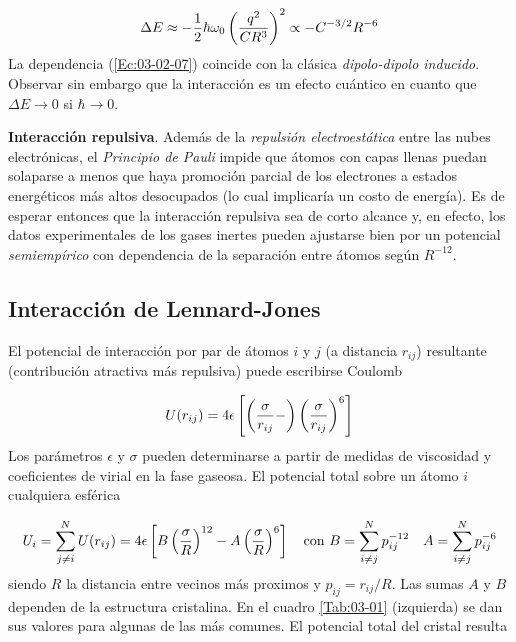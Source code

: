 \begin{equation}
\Delta E \approx - \frac{1}{2} \hbar \omega_0 \left( \frac{q^2}{CR^3} \right)^2 \propto -C^{-3/2}  R^{-6} \label{Ec:03-02-07}
\end{equation}
La dependencia (\ref{Ec:03-02-07}) coincide con la clásica \textit{dipolo-dipolo inducido}. Observar sin embargo que la interacción es un efecto cuántico en cuanto que $\Delta E \rightarrow 0$ si $\hbar \rightarrow 0$. 

\textbf{Interacción repulsiva}. Además de la \textit{repulsión electroestática} entre las nubes electrónicas, el \textit{Principio de Pauli} impide que átomos con capas llenas puedan solaparse a menos que haya promoción parcial de los electrones a estados energéticos más altos desocupados (lo cual implicaría un costo de energía). Es de esperar entonces que la interacción repulsiva sea de corto alcance y, en efecto, los datos experimentales de los gases inertes pueden ajustarse bien por un potencial \textit{semiempírico} con dependencia de la separación entre átomos según $R^{-12}$.

\subsection{Interacción de Lennard-Jones}

El potencial de interacción por par de átomos $i$ y $j$ (a distancia $r_{ij}$) resultante (contribución atractiva más repulsiva) puede escribirse Coulomb

\begin{equation}
    U (r_{ij}) = 4 \epsilon \left[ \left( \frac{\sigma}{r_{ij}}- \right)\left( \frac{\sigma}{r_{ij}} \right)^6 \right]
\end{equation}
Los parámetros $\epsilon$ y $\sigma$ pueden determinarse a partir de medidas de viscosidad y coeficientes de virial en la fase gaseosa. El potencial total sobre un átomo $i$ cualquiera esférica

\begin{equation}
    U_i = \sum_{j\neq i}^N U(r_{ij}) = 4 \epsilon \left[ B \left( \frac{\sigma}{R} \right)^{12}-A\left( \frac{\sigma}{R} \right)^6 \right] \quad \text{con} \ B = \sum_{i\neq j}^N p_{ij}^{-12} \quad A = \sum_{i\neq j}^N p_{ij}^{-6} 
\end{equation}
siendo $R$ la distancia entre vecinos más proximos y $p_{ij}=r_{ij}/R$. Las sumas $A$ y $B$ dependen de la estructura cristalina. En el cuadro \ref{Tab:03-01} (izquierda) se dan sus valores para algunas de las más comunes. El potencial total del cristal resulta

